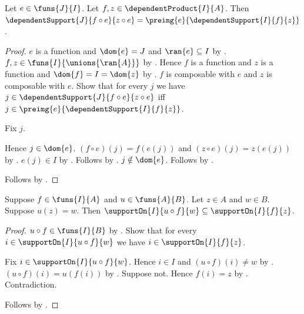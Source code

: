 \begin{theorem}\label{dependent_support_precomposition}
    Let $e\in\funs{J}{I}$.
    Let $f,z\in\dependentProduct{I}{A}$.
    Then
        $\dependentSupport{J}{f\circ e}{z\circ e}
            =\preimg{e}{\dependentSupport{I}{f}{z}}$.
\end{theorem}
\begin{proof}
    $e$ is a function and $\dom{e}=J$ and $\ran{e}\subseteq I$ by
        .
    $f,z\in\funs{I}{\unions{\ran{A}}}$ by
        .
    Hence $f$ is a function and $z$ is a function and
        $\dom{f}=I=\dom{z}$ by
        .
    $f$ is composable with $e$ and $z$ is composable with $e$.
    Show that for every $j$ we have
        $j\in\dependentSupport{J}{f\circ e}{z\circ e}$ iff
        $j\in\preimg{e}{\dependentSupport{I}{f}{z}}$.
    \begin{subproof}
        Fix $j$.
        \begin{byCase}
            Hence $j\in\dom{e}$.
            $(f\circ e)(j)=f(e(j))$ and
                $(z\circ e)(j)=z(e(j))$ by
                .
            $e(j)\in I$ by .
            Follows by
                .
            $j\notin\dom{e}$.
            Follows by
                .
        \end{byCase}
    \end{subproof}
    Follows by .
\end{proof}

\begin{theorem}\label{support_postcomposition_bound}
    Suppose $f\in\funs{I}{A}$ and $u\in\funs{A}{B}$.
    Let $z\in A$ and $w\in B$.
    Suppose $u(z)=w$.
    Then
        $\supportOn{I}{u\circ f}{w}\subseteq\supportOn{I}{f}{z}$.
\end{theorem}
\begin{proof}
    $u\circ f\in\funs{I}{B}$ by .
    Show that for every $i\in\supportOn{I}{u\circ f}{w}$ we have
        $i\in\supportOn{I}{f}{z}$.
    \begin{subproof}
        Fix $i\in\supportOn{I}{u\circ f}{w}$.
        Hence $i\in I$ and $(u\circ f)(i)\neq w$ by
            .
        $(u\circ f)(i)=u(f(i))$ by
            .
        Suppose not.
        Hence $f(i)=z$ by .
        Contradiction.
    \end{subproof}
    Follows by .
\end{proof}

